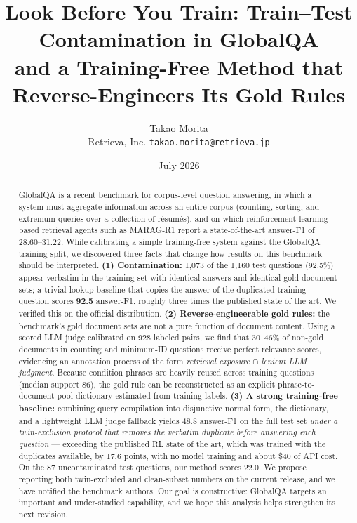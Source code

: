 \documentclass[11pt]{article}
\title{Look Before You Train: Train--Test Contamination in GlobalQA\\
and a Training-Free Method that Reverse-Engineers Its Gold Rules}
\author{Takao Morita\\
Retrieva, Inc. \quad \texttt{takao.morita@retrieva.jp}}
\date{July 2026}
\begin{document}
\maketitle

\begin{abstract}
GlobalQA is a recent benchmark for corpus-level question answering, in which a system must aggregate information across an entire corpus (counting, sorting, and extremum queries over a collection of r\'esum\'es), and on which reinforcement-learning-based retrieval agents such as MARAG-R1 report a state-of-the-art answer-F1 of 28.60--31.22. While calibrating a simple training-free system against the GlobalQA training split, we discovered three facts that change how results on this benchmark should be interpreted. \textbf{(1) Contamination:} 1{,}073 of the 1{,}160 test questions (92.5\%) appear verbatim in the training set with identical answers and identical gold document sets; a trivial lookup baseline that copies the answer of the duplicated training question scores \textbf{92.5} answer-F1, roughly three times the published state of the art. We verified this on the official distribution. \textbf{(2) Reverse-engineerable gold rules:} the benchmark's gold document sets are not a pure function of document content. Using a scored LLM judge calibrated on 928 labeled pairs, we find that 30--46\% of non-gold documents in counting and minimum-ID questions receive perfect relevance scores, evidencing an annotation process of the form \emph{retrieval exposure $\cap$ lenient LLM judgment}. Because condition phrases are heavily reused across training questions (median support 86), the gold rule can be reconstructed as an explicit phrase-to-document-pool dictionary estimated from training labels. \textbf{(3) A strong training-free baseline:} combining query compilation into disjunctive normal form, the dictionary, and a lightweight LLM judge fallback yields 48.8 answer-F1 on the full test set \emph{under a twin-exclusion protocol that removes the verbatim duplicate before answering each question} --- exceeding the published RL state of the art, which was trained with the duplicates available, by 17.6 points, with no model training and about \$40 of API cost. On the 87 uncontaminated test questions, our method scores 22.0. We propose reporting both twin-excluded and clean-subset numbers on the current release, and we have notified the benchmark authors. Our goal is constructive: GlobalQA targets an important and under-studied capability, and we hope this analysis helps strengthen its next revision.
\end{abstract}
\end{document}
